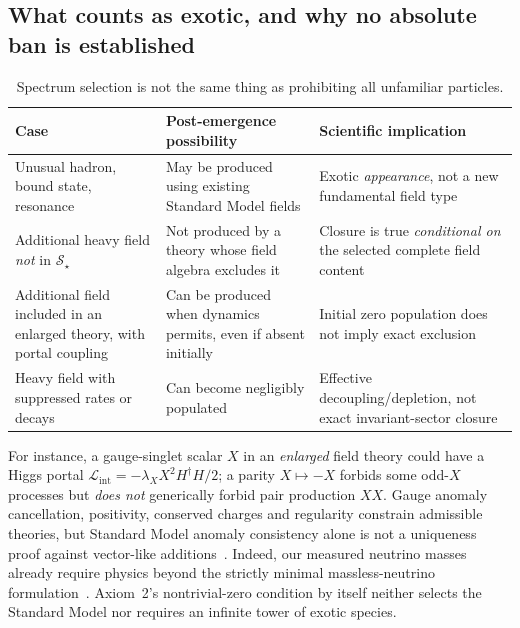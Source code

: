 \documentclass[11pt,a4paper]{article}
\theoremstyle{tmon}
\theoremstyle{definition}
\begin{document}
\subsection{What counts as exotic, and why no absolute ban is established}
\begin{table}[htbp]\centering\small
\begin{tabularx}{\linewidth}{@{}p{.27\linewidth}YY@{}}\toprule
\textbf{Case} & \textbf{Post-emergence possibility} & \textbf{Scientific implication}\\\midrule
Unusual hadron, bound state, resonance & May be produced using existing Standard Model fields & Exotic \emph{appearance}, not a new fundamental field type\\
Additional heavy field \emph{not} in $\mathscr S_\star$ & Not produced by a theory whose field algebra excludes it & Closure is true \emph{conditional on} the selected complete field content\\
Additional field included in an enlarged theory, with portal coupling & Can be produced when dynamics permits, even if absent initially & Initial zero population does not imply exact exclusion\\
Heavy field with suppressed rates or decays & Can become negligibly populated & Effective decoupling/depletion, not exact invariant-sector closure\\
\bottomrule\end{tabularx}
\caption{Spectrum selection is not the same thing as prohibiting all unfamiliar particles.}\label{tab:s001cases}
\end{table}

For instance, a gauge-singlet scalar $X$ in an \emph{enlarged} field theory could have a Higgs portal $\mathcal L_{\mathrm{int}}=-\lambda_X X^2 H^\dagger H/2$; a parity $X\mapsto-X$ forbids some odd-$X$ processes but \emph{does not} generically forbid pair production $XX$. Gauge anomaly cancellation, positivity, conserved charges and regularity constrain admissible theories, but Standard Model anomaly consistency alone is not a uniqueness proof against vector-like additions~\cite{PDGVectorlike}. Indeed, our measured neutrino masses already require physics beyond the strictly minimal massless-neutrino formulation~\cite{CERNBSM}. Axiom~2's nontrivial-zero condition by itself neither selects the Standard Model nor requires an infinite tower of exotic species.
\end{document}
